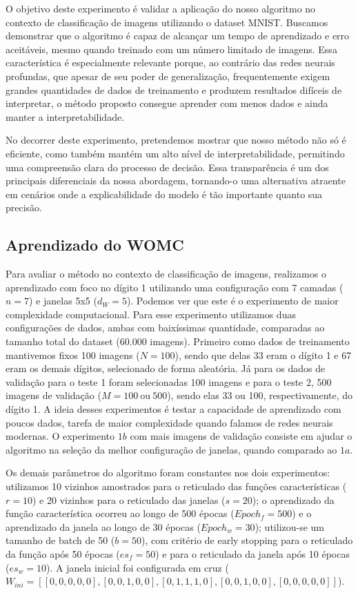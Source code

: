 O objetivo deste experimento é validar a aplicação do nosso algoritmo no contexto de classificação de imagens utilizando o dataset MNIST. Buscamos demonstrar que o algoritmo é capaz de alcançar um tempo de aprendizado e erro aceitáveis, mesmo quando treinado com um número limitado de imagens. Essa característica é especialmente relevante porque, ao contrário das redes neurais profundas, que apesar de seu poder de generalização, frequentemente exigem grandes quantidades de dados de treinamento e produzem resultados difíceis de interpretar, o método proposto consegue aprender com menos dados e ainda manter a interpretabilidade.

No decorrer deste experimento, pretendemos mostrar que nosso método não só é eficiente, como também mantém um alto nível de interpretabilidade, permitindo uma compreensão clara do processo de decisão. Essa transparência é um dos principais diferenciais da nossa abordagem, tornando-o uma alternativa atraente em cenários onde a explicabilidade do modelo é tão importante quanto sua precisão.

\subsection{Aprendizado do WOMC}

Para avaliar o método no contexto de classificação de imagens, realizamos o aprendizado com foco no dígito 1 utilizando uma configuração com 7 camadas ($n=7$) e janelas 5x5 ($d_{W} = 5$). Podemos ver que este é o experimento de maior complexidade computacional. Para esse experimento utilizamos duas configurações de dados, ambas com baixíssimas quantidade, comparadas ao tamanho total do dataset (60.000 imagens). Primeiro como dados de treinamento mantivemos fixos 100 imagens ($N = 100$), sendo que delas 33 eram o dígito 1 e 67 eram os demais dígitos, selecionado de forma aleatória. Já para os dados de validação para o teste 1 foram selecionadas 100 imagens e para o teste 2, 500 imagens de validação ($M = 100 \ \text{ou} \ 500$), sendo elas 33 ou 100, respectivamente, do dígito 1. A ideia desses experimentos é testar a capacidade de aprendizado com poucos dados, tarefa de maior complexidade quando falamos de redes neurais modernas. O experimento $1b$ com mais imagens de validação consiste em ajudar o algoritmo na seleção da melhor configuração de janelas, quando comparado ao $1a$. 

Os demais parâmetros do algoritmo foram constantes nos dois experimentos: utilizamos 10 vizinhos amostrados para o reticulado das funções características ($r=10$) e 20 vizinhos para o reticulado das janelas ($s=20$); o aprendizado da função característica ocorreu ao longo de 500 épocas ($Epoch_f = 500$) e o aprendizado da janela ao longo de 30 épocas ($Epoch_w = 30$); utilizou-se um tamanho de batch de 50 ($b=50$), com critério de early stopping para o reticulado da função após 50 épocas ($es_{f} = 50$) e para o reticulado da janela após 10 épocas ($es_{w} = 10$). A janela inicial foi configurada em cruz ($W_{ini} = [[0,0,0,0,0],[0,0,1,0,0],[0,1,1,1,0],[0,0,1,0,0],[0,0,0,0,0]]$).

